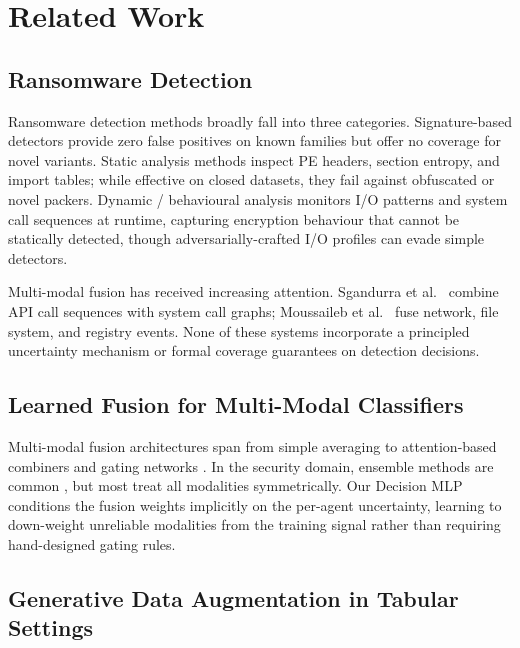 \documentclass[journal]{IEEEtran}
\begin{document}
\section{Related Work}
\label{sec:related}

\subsection{Ransomware Detection}

Ransomware detection methods broadly fall into three categories.
Signature-based detectors \cite{yadron2014symantec} provide zero false
positives on known families but offer no coverage for novel variants.
Static analysis methods \cite{rdset_2021} inspect PE headers, section
entropy, and import tables; while effective on closed datasets, they
fail against obfuscated or novel packers.
Dynamic / behavioural analysis \cite{scaife_cryptolock_2016}
monitors I/O patterns and system call sequences at runtime, capturing
encryption behaviour that cannot be statically detected, though
adversarially-crafted I/O profiles can evade simple detectors.

Multi-modal fusion has received increasing attention.
Sgandurra et al.\ \cite{sgandurra_automated_2016} combine API call
sequences with system call graphs; Moussaileb et al.\
\cite{moussaileb_ransomware_2021} fuse network, file system, and registry
events.
None of these systems incorporate a principled uncertainty mechanism or
formal coverage guarantees on detection decisions.

\subsection{Learned Fusion for Multi-Modal Classifiers}

Multi-modal fusion architectures span from simple averaging
\cite{ramachandram_deep_multimodal_2017} to attention-based combiners
\cite{vaswani_attention_2017} and gating networks
\cite{jacobs_mixture_1991}.
In the security domain, ensemble methods are common
\cite{sagi_ensemble_2018}, but most treat all modalities symmetrically.
Our Decision MLP conditions the fusion weights implicitly on the
per-agent uncertainty, learning to down-weight unreliable modalities
from the training signal rather than requiring hand-designed gating rules.

\subsection{Generative Data Augmentation in Tabular Settings}
\end{document}
